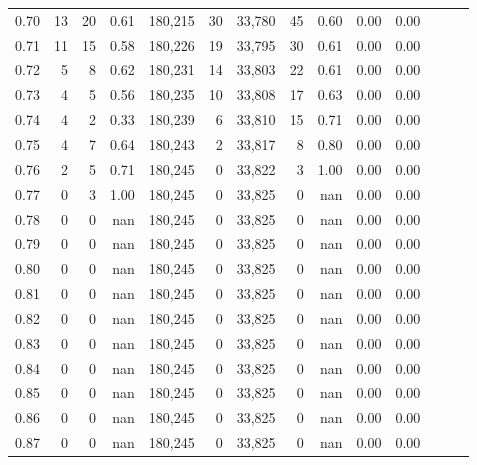 \begin{tabular}{rrrrrrrrrrrrrr}
0.70 &      13 &     20 &  0.61 &  180,215 &       30 &  33,780 &      45 &  0.60 &  0.00 &      0.00 \\
0.71 &      11 &     15 &  0.58 &  180,226 &       19 &  33,795 &      30 &  0.61 &  0.00 &      0.00 \\
0.72 &       5 &      8 &  0.62 &  180,231 &       14 &  33,803 &      22 &  0.61 &  0.00 &      0.00 \\
0.73 &       4 &      5 &  0.56 &  180,235 &       10 &  33,808 &      17 &  0.63 &  0.00 &      0.00 \\
0.74 &       4 &      2 &  0.33 &  180,239 &        6 &  33,810 &      15 &  0.71 &  0.00 &      0.00 \\
0.75 &       4 &      7 &  0.64 &  180,243 &        2 &  33,817 &       8 &  0.80 &  0.00 &      0.00 \\
0.76 &       2 &      5 &  0.71 &  180,245 &        0 &  33,822 &       3 &  1.00 &  0.00 &      0.00 \\
0.77 &       0 &      3 &  1.00 &  180,245 &        0 &  33,825 &       0 &   nan &  0.00 &      0.00 \\
0.78 &       0 &      0 &   nan &  180,245 &        0 &  33,825 &       0 &   nan &  0.00 &      0.00 \\
0.79 &       0 &      0 &   nan &  180,245 &        0 &  33,825 &       0 &   nan &  0.00 &      0.00 \\
0.80 &       0 &      0 &   nan &  180,245 &        0 &  33,825 &       0 &   nan &  0.00 &      0.00 \\
0.81 &       0 &      0 &   nan &  180,245 &        0 &  33,825 &       0 &   nan &  0.00 &      0.00 \\
0.82 &       0 &      0 &   nan &  180,245 &        0 &  33,825 &       0 &   nan &  0.00 &      0.00 \\
0.83 &       0 &      0 &   nan &  180,245 &        0 &  33,825 &       0 &   nan &  0.00 &      0.00 \\
0.84 &       0 &      0 &   nan &  180,245 &        0 &  33,825 &       0 &   nan &  0.00 &      0.00 \\
0.85 &       0 &      0 &   nan &  180,245 &        0 &  33,825 &       0 &   nan &  0.00 &      0.00 \\
0.86 &       0 &      0 &   nan &  180,245 &        0 &  33,825 &       0 &   nan &  0.00 &      0.00 \\
0.87 &       0 &      0 &   nan &  180,245 &        0 &  33,825 &       0 &   nan &  0.00 &      0.00 \\

\end{tabular}
